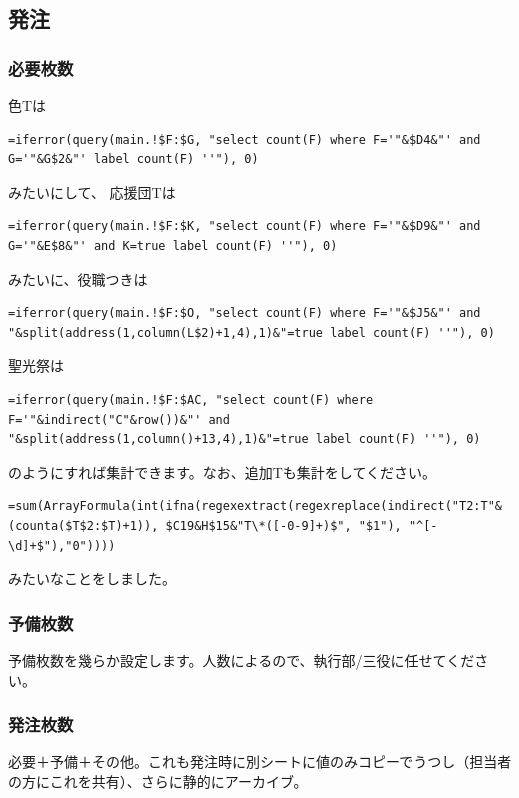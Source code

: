 \documentclass[a4paper]{ltjsreport}
\begin{document}
\subsection{発注}
\subsubsection{必要枚数}
色Tは

\begin{lstlisting}
=iferror(query(main.!$F:$G, "select count(F) where F='"&$D4&"' and G='"&G$2&"' label count(F) ''"), 0)
\end{lstlisting}

みたいにして、
応援団Tは

\begin{lstlisting}
=iferror(query(main.!$F:$K, "select count(F) where F='"&$D9&"' and G='"&E$8&"' and K=true label count(F) ''"), 0)
\end{lstlisting}

みたいに、役職つきは

\begin{lstlisting}
=iferror(query(main.!$F:$O, "select count(F) where F='"&$J5&"' and "&split(address(1,column(L$2)+1,4),1)&"=true label count(F) ''"), 0)
\end{lstlisting}

聖光祭は

\begin{lstlisting}
=iferror(query(main.!$F:$AC, "select count(F) where F='"&indirect("C"&row())&"' and "&split(address(1,column()+13,4),1)&"=true label count(F) ''"), 0)
\end{lstlisting}

のようにすれば集計できます。なお、追加Tも集計をしてください。

\begin{lstlisting}
=sum(ArrayFormula(int(ifna(regexextract(regexreplace(indirect("T2:T"&(counta($T$2:$T)+1)), $C19&H$15&"T\*([-0-9]+)$", "$1"), "^[-\d]+$"),"0"))))
\end{lstlisting}

みたいなことをしました。

\subsubsection{予備枚数}
予備枚数を幾らか設定します。人数によるので、執行部/三役に任せてください。

\subsubsection{発注枚数}
必要＋予備＋その他。これも発注時に別シートに値のみコピーでうつし（担当者の方にこれを共有）、さらに静的にアーカイブ。
\end{document}
